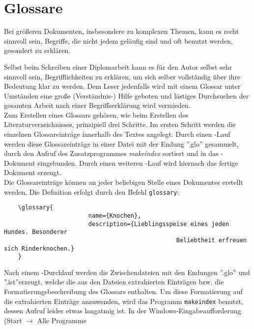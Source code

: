 %
%

\section{Glossare}
\label{sec:glossar}

Bei größeren Dokumenten, insbesondere zu komplexen Themen, kann es recht
sinnvoll sein, Begriffe, die nicht jedem geläufig sind und oft benutzt
werden, gesondert zu erklären.

Selbst beim Schreiben einer Diplomarbeit kann es für den Autor selbst
sehr sinnvoll sein, Begrifflichkeiten zu erklären, um sich selber vollständig
über ihre Bedeutung klar zu werden. Dem Leser jedenfalls wird mit einem Glossar
unter Umständen eine große (Verständnis-) Hilfe geboten und lästiges
Durchsuchen der gesamten Arbeit nach einer Begriffserklärung wird vermieden.
\vspace{1em}
\\
Zum Erstellen eines Glossars gehören, wie beim Erstellen des Literaturverzeichnisses,
 prinzipiell drei Schritte.
Im ersten Schritt werden die einzelnen Glossareinträge innerhalb des Textes
angelegt. Durch einen \DMLLaTeX-Lauf werden diese Glossareinträge in
einer Datei mit der Endung ''.glo'' gesammelt, durch den Aufruf des
Zusatzprogrammes \emph{makeindex} sortiert und in das \DMLLaTeX-Dokument
eingebunden. Durch einen weiteren \DMLLaTeX-Lauf wird hiernach das fertige
Dokument erzeugt.
\vspace{1em}
\\
Die Glossareinträge können an jeder beliebigen Stelle eines Dokumentes erstellt werden.
Die Definition erfolgt durch den Befehl \texttt{glossary}:
\begin{verbatim}
	\glossary{
						name={Knochen},
						description={Lieblingsspeise eines jeden Hundes. Besonderer
												 Beliebtheit erfreuen sich Rinderknochen.}
	}
\end{verbatim}
Nach einem  \DMLLaTeX-Durchlauf  werden die Zwischendateien mit den Endungen ''.glo'' und
''.ist''erzeugt, welche die aus den Dateien extrahierten Einträgen bzw. die
Formatierungsbeschreibung des Glossars enthalten. Um diese Formatierung auf die extrahierten
Einträge anzuwenden, wird das Programm \texttt{makeindex} benutzt, dessen Aufruf leider
etwas langatmig ist. In der Windows-Eingabeaufforderung (Start $\rightarrow$ Alle Programme

